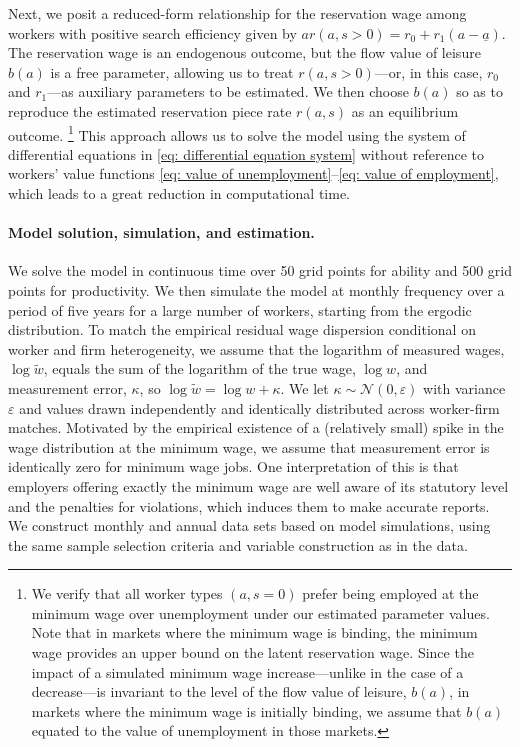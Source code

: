 Next, we posit a reduced-form relationship for the reservation wage among workers with positive search efficiency given by $ar(a,s>0)=r_0 + r_1(a-\underline{a})$. The reservation wage is an endogenous outcome, but the flow value of leisure $b(a)$ is a free parameter, allowing us to treat $r(a,s>0)$---or, in this case, $r_0$ and $r_1$---as auxiliary parameters to be estimated. We then choose $b(a)$ so as to reproduce the estimated reservation piece rate $r(a,s)$ as an equilibrium outcome.%
%
\footnote{We verify that all worker types $(a,s=0)$ prefer being employed at the minimum wage over unemployment under our estimated parameter values. Note that in markets where the minimum wage is binding, the minimum wage provides an upper bound on the latent reservation wage. Since the impact of a simulated minimum wage increase---unlike in the case of a decrease---is invariant to the level of the flow value of leisure, $b(a)$, in markets where the minimum wage is initially binding, we assume that $b(a)$ equated to the value of unemployment in those markets.} %
%
This approach allows us to solve the model using the system of differential equations in \eqref{eq: differential equation system} without reference to workers' value functions \eqref{eq: value of unemployment}--\eqref{eq: value of employment}, which leads to a great reduction in computational time.


\paragraph{Model solution, simulation, and estimation.}

We solve the model in continuous time over 50 grid points for ability and 500 grid points for productivity. We then simulate the model at monthly frequency over a period of five years for a large number of workers, starting from the ergodic distribution.
%
To match the empirical residual wage dispersion conditional on worker and firm heterogeneity, we assume that the logarithm of measured wages, $\log \tilde{w}$, equals the sum of the logarithm of the true wage, $\log w$, and measurement error, $\kappa$, so $\log \tilde{w} = \log w + \kappa$. We let $\kappa \sim \mathcal{N}(0,\varepsilon)$ with variance $\varepsilon$ and values drawn independently and identically distributed across worker-firm matches. Motivated by the empirical existence of a (relatively small) spike in the wage distribution at the minimum wage, we assume that measurement error is identically zero for minimum wage jobs. One interpretation of this is that employers offering exactly the minimum wage are well aware of its statutory level and the penalties for violations, which induces them to make accurate reports. We construct monthly and annual data sets based on model simulations, using the same sample selection criteria and variable construction as in the data.

